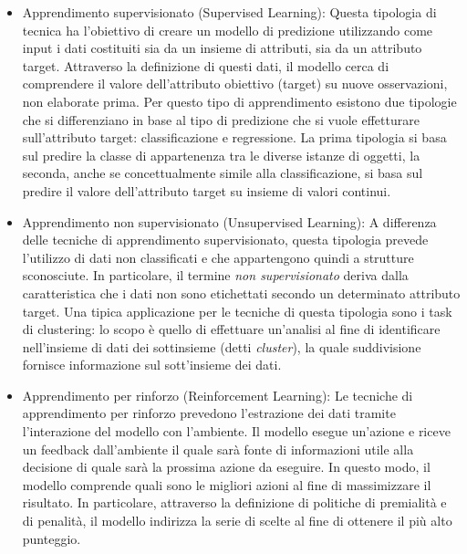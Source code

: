 \begin{itemize}
    \item Apprendimento supervisionato (Supervised Learning): Questa tipologia di tecnica ha l'obiettivo di creare un modello di predizione utilizzando come input i dati costituiti sia da un insieme di attributi, sia da un attributo target. Attraverso la definizione di questi dati, il modello cerca di comprendere il valore dell'attributo obiettivo (target) su nuove osservazioni, non elaborate prima. Per questo tipo di apprendimento esistono due tipologie che si differenziano in base al tipo di predizione che si vuole effetturare sull'attributo target: classificazione e regressione.
    La prima tipologia si basa sul predire la classe di appartenenza tra le diverse istanze di oggetti, la seconda, anche se concettualmente simile alla classificazione, si basa sul predire il valore dell'attributo target su insieme di valori continui.
    \item Apprendimento non supervisionato (Unsupervised Learning): A differenza delle tecniche di apprendimento supervisionato, questa tipologia prevede l'utilizzo di dati non classificati e che appartengono quindi a strutture sconosciute. In particolare, il termine \textit{non supervisionato} deriva dalla caratteristica che i dati non sono etichettati secondo un determinato attributo target. Una tipica applicazione per le tecniche di questa tipologia sono i task di clustering: lo scopo è quello di effettuare un'analisi al fine di identificare nell'insieme di dati dei sottinsieme (detti \textit{cluster}), la quale suddivisione fornisce informazione sul sott'insieme dei dati.
    \item Apprendimento per rinforzo (Reinforcement Learning): Le tecniche di apprendimento per rinforzo prevedono l'estrazione dei dati tramite l'interazione del modello con l'ambiente. Il modello esegue un'azione e riceve un feedback dall'ambiente il quale sarà fonte di informazioni utile alla decisione di quale sarà la prossima azione da eseguire. In questo modo, il modello comprende quali sono le migliori azioni al fine di massimizzare il risultato. In particolare, attraverso la definizione di politiche di premialità e di penalità, il modello indirizza la serie di scelte al fine di ottenere il più alto punteggio.
\end{itemize}


